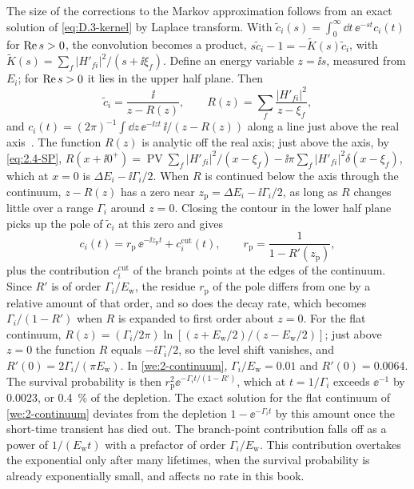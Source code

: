 The size of the corrections to the Markov approximation follows from an exact solution of \cref{eq:D.3-kernel} by Laplace transform. With $\tilde c_i(s) = \int_0^\infty\dd t\,\ee^{-st}c_i(t)$ for $\operatorname{Re} s > 0$, the convolution becomes a product, $s\tilde c_i - 1 = -\tilde K(s)\tilde c_i$, with $\tilde K(s) = \sum_f|H'_{fi}|^2/(s + \ii\xi_f)$. Define an energy variable $z = \ii s$, measured from $E_i$; for $\operatorname{Re} s > 0$ it lies in the upper half plane. Then
\begin{equation}
  \tilde c_i = \frac{\ii}{z - R(z)}, \qquad R(z) = \sum_f\frac{|H'_{fi}|^2}{z - \xi_f} ,
  \label{eq:D.3-resolvent}
\end{equation}
and $c_i(t) = (2\pi)^{-1}\int\dd z\,\ee^{-\ii zt}\,\ii/(z - R(z))$ along a line just above the real axis~\cite[Chap.~III]{cohentannoudji1998atom}. The function $R(z)$ is analytic off the real axis; just above the axis, by \cref{eq:2.4-SP}, $R(x + \ii0^+) = \operatorname{PV}\sum_f|H'_{fi}|^2/(x - \xi_f) - \ii\pi\sum_f|H'_{fi}|^2\delta(x - \xi_f)$, which at $x = 0$ is $\Delta E_i - \ii\varGamma_i/2$. When $R$ is continued below the axis through the continuum, $z - R(z)$ has a zero near $z_{\mathrm{p}} = \Delta E_i - \ii\varGamma_i/2$, as long as $R$ changes little over a range $\varGamma_i$ around $z = 0$. Closing the contour in the lower half plane picks up the pole of $\tilde c_i$ at this zero and gives
\begin{equation*}
  c_i(t) = r_{\mathrm{p}}\,\ee^{-\ii z_{\mathrm{p}}t} + c_i^{\mathrm{cut}}(t), \qquad r_{\mathrm{p}} = \frac{1}{1 - R'(z_{\mathrm{p}})} ,
\end{equation*}
plus the contribution $c_i^{\mathrm{cut}}$ of the branch points at the edges of the continuum. Since $R'$ is of order $\varGamma_i/E_{\mathrm{w}}$, the residue $r_{\mathrm{p}}$ of the pole differs from one by a relative amount of that order, and so does the decay rate, which becomes $\varGamma_i/(1 - R')$ when $R$ is expanded to first order about $z = 0$. For the flat continuum, $R(z) = (\varGamma_i/2\pi)\ln[(z + E_{\mathrm{w}}/2)/(z - E_{\mathrm{w}}/2)]$; just above $z = 0$ the function $R$ equals $-\ii\varGamma_i/2$, so the level shift vanishes, and $R'(0) = 2\varGamma_i/(\pi E_{\mathrm{w}})$. In \cref{we:2-continuum}, $\varGamma_i/E_{\mathrm{w}} = 0.01$ and $R'(0) = 0.0064$. The survival probability is then $r_{\mathrm{p}}^2\ee^{-\varGamma_it/(1 - R')}$, which at $t = 1/\varGamma_i$ exceeds $\ee^{-1}$ by $0.0023$, or \SI{0.4}{\percent} of the depletion. The exact solution for the flat continuum of \cref{we:2-continuum} deviates from the depletion $1 - \ee^{-\varGamma_it}$ by this amount once the short-time transient has died out. The branch-point contribution falls off as a power of $1/(E_{\mathrm{w}}t)$ with a prefactor of order $\varGamma_i/E_{\mathrm{w}}$. This contribution overtakes the exponential only after many lifetimes, when the survival probability is already exponentially small, and affects no rate in this book.

